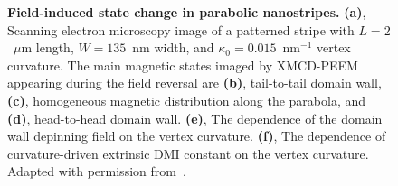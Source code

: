 \begin{figure}
	\caption{\textbf{Field-induced state change in parabolic nanostripes.} \textbf{(a)}, Scanning electron microscopy image of a patterned stripe with $L=2$~$\mu$m length, $W=135$~nm width, and $\kappa_0=0.015$~nm$^{-1}$ vertex curvature. The main magnetic states imaged by XMCD-PEEM appearing during the field reversal are \textbf{(b)}, tail-to-tail domain wall, \textbf{(c)}, homogeneous magnetic distribution along the parabola, and \textbf{(d)}, head-to-head domain wall. \textbf{(e)}, The dependence of the domain wall depinning field on the vertex curvature. \textbf{(f)}, The dependence of curvature-driven extrinsic DMI constant on the vertex curvature. Adapted with permission from~\cite{Volkov19c}.}
	\label{fig:Experiment_parabola}
\end{figure}

